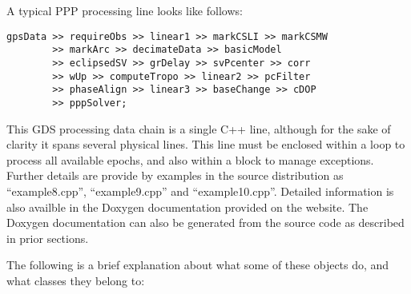 A typical PPP processing line looks like follows:


\begin{scriptsize}
\begin{lstlisting}
gpsData >> requireObs >> linear1 >> markCSLI >> markCSMW
        >> markArc >> decimateData >> basicModel
        >> eclipsedSV >> grDelay >> svPcenter >> corr
        >> wUp >> computeTropo >> linear2 >> pcFilter
        >> phaseAlign >> linear3 >> baseChange >> cDOP
        >> pppSolver;
\end{lstlisting}
\end{scriptsize}


This GDS processing data chain is a single C++ line, although for the
sake of clarity it spans several physical lines. This line must be enclosed within a
 loop to process all available epochs, and also within a
 block to manage exceptions. Further details are provide
by examples in the source distribution as ``example8.cpp'', ``example9.cpp'' and
``example10.cpp''. Detailed information is also availble in the Doxygen documentation provided on the website. The Doxygen documentation can also be generated from the source code as described in prior sections.

The following is a brief explanation about what some of these objects do,
and what classes they belong to:

